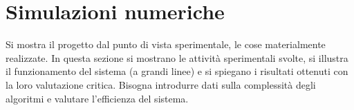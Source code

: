 \chapter{Simulazioni numeriche}
\label{capitolo5}

Si mostra il progetto dal punto di vista sperimentale, le cose materialmente realizzate. In questa sezione si mostrano le attività sperimentali svolte, si illustra il funzionamento del sistema (a grandi linee) e si spiegano i risultati ottenuti con la loro valutazione critica. Bisogna introdurre dati sulla complessità degli algoritmi e valutare l'efficienza del sistema.